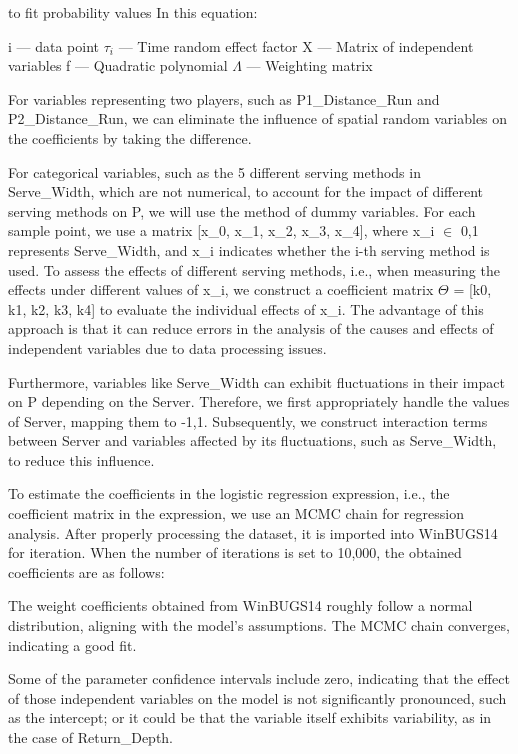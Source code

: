 \documentclass[12pt]{article}
\begin{document}
to fit probability values
In this equation:

i —  data point
$\tau_{i}$ — Time random effect factor
X — Matrix of independent variables 
f — Quadratic polynomial
$\Lambda$ — Weighting matrix

For variables representing two players, such as P1\_Distance\_Run and P2\_Distance\_Run, we can eliminate the influence of spatial random variables on the coefficients by taking the difference.

For categorical variables, such as the 5 different serving methods in Serve\_Width, which are not numerical, to account for the impact of different serving methods on P, we will use the method of dummy variables. For each sample point, we use a matrix [x\_0, x\_1, x\_2, x\_3, x\_4], where x\_i $\in$ {0,1} represents Serve\_Width, and x\_i indicates whether the i-th serving method is used. To assess the effects of different serving methods, i.e., when measuring the effects under different values of x\_i, we construct a coefficient matrix $\Theta$ = [k0, k1, k2, k3, k4] to evaluate the individual effects of x\_i. The advantage of this approach is that it can reduce errors in the analysis of the causes and effects of independent variables due to data processing issues.

Furthermore, variables like Serve\_Width can exhibit fluctuations in their impact on P depending on the Server. Therefore, we first appropriately handle the values of Server, mapping them to {-1,1}. Subsequently, we construct interaction terms between Server and variables affected by its fluctuations, such as Serve\_Width, to reduce this influence.

To estimate the coefficients in the logistic regression expression, i.e., the coefficient matrix in the expression, we use an MCMC chain for regression analysis. After properly processing the dataset, it is imported into WinBUGS14 for iteration. When the number of iterations is set to 10,000, the obtained coefficients are as follows:

The weight coefficients obtained from WinBUGS14 roughly follow a normal distribution, aligning with the model's assumptions. The MCMC chain converges, indicating a good fit.

Some of the parameter confidence intervals include zero, indicating that the effect of those independent variables on the model is not significantly pronounced, such as the intercept; or it could be that the variable itself exhibits variability, as in the case of Return\_Depth.
\end{document}
